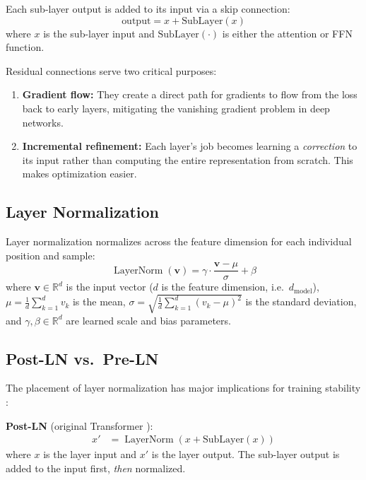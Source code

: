 \documentclass[11pt,a4paper]{article}
\newcommand{\R}{\mathbb{R}}
\newcommand{\LayerNorm}{\operatorname{LayerNorm}}
\newcommand{\dmodel}{d_{\text{model}}}
\begin{document}
Each sub-layer output is added to its input via a skip connection:
\begin{equation}
  \text{output} = x + \text{SubLayer}(x)
\end{equation}
where $x$ is the sub-layer input and $\text{SubLayer}(\cdot)$ is either the attention
or FFN function.

Residual connections serve two critical purposes:
\begin{enumerate}[nosep]
  \item \textbf{Gradient flow:} They create a direct path for gradients to flow from
    the loss back to early layers, mitigating the vanishing gradient problem in deep
    networks.
  \item \textbf{Incremental refinement:} Each layer's job becomes learning a
    \emph{correction} to its input rather than computing the entire representation from
    scratch. This makes optimization easier.
\end{enumerate}

\subsection{Layer Normalization}

Layer normalization \cite{xiong2020} normalizes across the feature dimension for each
individual position and sample:
\begin{equation}
  \LayerNorm(\bm{v}) = \gamma \cdot \frac{\bm{v} - \mu}{\sigma} + \beta
\end{equation}
where $\bm{v} \in \R^d$ is the input vector ($d$ is the feature dimension, i.e.\ $\dmodel$),
$\mu = \frac{1}{d}\sum_{k=1}^{d} v_k$ is the mean,
$\sigma = \sqrt{\frac{1}{d}\sum_{k=1}^{d}(v_k - \mu)^2}$ is the standard deviation,
and $\gamma, \beta \in \R^d$ are learned scale and bias parameters.

\subsection{Post-LN vs.\ Pre-LN}
\label{sec:post-pre-ln}

The placement of layer normalization has major implications for training stability
\cite{xiong2020}:

\textbf{Post-LN} (original Transformer \cite{vaswani2017}):
\begin{align}
  x' &= \LayerNorm(x + \text{SubLayer}(x))
\end{align}
where $x$ is the layer input and $x'$ is the layer output.
The sub-layer output is added to the input first, \emph{then} normalized.
\end{document}
